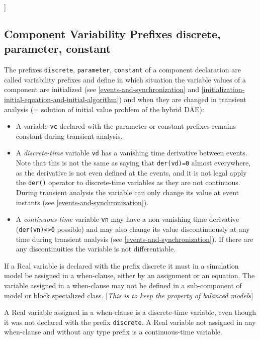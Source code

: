 {]}

\subsection{Component Variability Prefixes discrete, parameter, constant}

The prefixes \lstinline!discrete!, \lstinline!parameter!, \lstinline!constant! of a component declaration
are called variability prefixes and define in which situation the
variable values of a component are initialized (see \autoref{events-and-synchronization} and
\autoref{initialization-initial-equation-and-initial-algorithm}) and when they are changed in transient analysis (= solution
of initial value problem of the hybrid DAE):

\begin{itemize}
\item
  A variable \lstinline!vc! declared with the parameter or constant prefixes remains
  constant during transient analysis.
\item
  A \emph{discrete-time} variable \lstinline!vd! has a vanishing time derivative between events.
  Note that this is not the same as saying that \lstinline!der(vd)=0! almost everywhere,
  as the derivative is not even defined at the events, and it is not legal
  apply the \lstinline!der()! operator
  to discrete-time variables as they are not continuous. During transient analysis the variable
  can only change its value at event
  instants (see \autoref{events-and-synchronization}).
\item
  A \emph{continuous-time} variable \lstinline!vn! may have a non-vanishing time
  derivative (\lstinline!der(vn)<>0! possible) and may also
  change its value discontinuously at any time during transient analysis
  (see \autoref{events-and-synchronization}). If there are any discontinuities the variable is
  not differentiable.
\end{itemize}

If a Real variable is declared with the prefix discrete it must in a
simulation model be assigned in a when-clause, either by an assignment
or an equation. The variable assigned in a when-clause may not be
defined in a sub-component of model or block specialized class.
{[}\emph{This is to keep the property of balanced models}{]}

A Real variable assigned in a when-clause is a discrete-time variable,
even though it was not declared with the prefix \lstinline!discrete!. A Real
variable not assigned in any when-clause and without any type prefix is
a continuous-time variable.

